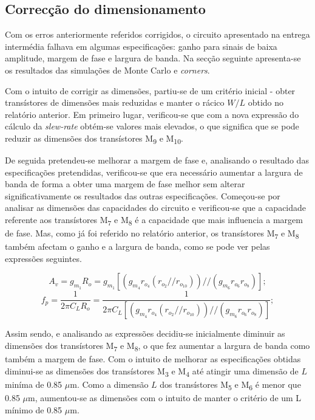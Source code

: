 \documentclass[11pt]{article}
\numberwithin{equation}{section}
\begin{document}
\subsection{Correcção do dimensionamento}

Com os erros anteriormente referidos corrigidos, o circuito apresentado na entrega intermédia falhava em algumas especificações: ganho para sinais de baixa amplitude, margem de fase e largura de banda. Na secção seguinte apresenta-se os resultados das simulações de Monte Carlo e \textit{corners}.

Com o intuito de corrigir as dimensões, partiu-se de um critério inicial - obter transístores de dimensões mais reduzidas e manter o rácico $W/L$ obtido no relatório anterior. Em primeiro lugar, verificou-se que com a nova expressão do cálculo da \textit{slew-rate} obtém-se valores mais elevados, o que significa que se pode reduzir as dimensões dos transístores M\textsubscript{9} e M\textsubscript{10}. 

De seguida pretendeu-se melhorar a margem de fase e, analisando o resultado das especificações pretendidas, verificou-se que era necessário aumentar a largura de banda de forma a obter uma margem de fase melhor sem alterar significativamente os resultados das outras especificações. Começou-se por analisar as dimensões das capacidades do circuito e verificou-se que a capacidade referente aos transístores M\textsubscript{7} e M\textsubscript{8} é a capacidade que mais influencia a margem de fase. Mas, como já foi referido no relatório anterior, os transístores M\textsubscript{7} e M\textsubscript{8} também afectam o ganho e a largura de banda, como se pode ver pelas expressões seguintes. 

\vspace{-3mm}
\begin{equation}
A_{v} = g_{m_1} R_o =  g_{m_1}\left[\left(g_{m_4}r_{o_4}\left(r_{o_2}//r_{o_{10}}\right)\right)//\left(g_{m_6}r_{o_6}r_{o_8}\right)\right];
\end{equation}
\vspace{-2mm}
\begin{equation}
f_{p} = \frac{1}{2\pi C_L R_o} = \frac{1}{2\pi C_L \left[\left(g_{m_4}r_{o_4}\left(r_{o_2}//r_{o_{10}}\right)\right)//\left(g_{m_6}r_{o_6}r_{o_8}\right)\right]};
\end{equation} 

\vspace{2mm}
Assim sendo, e analisando as expressões decidiu-se inicialmente diminuir as dimensões dos transístores M\textsubscript{7} e M\textsubscript{8}, o que fez aumentar a largura de banda como também a margem de fase. Com o intuito de melhorar as especificações obtidas diminui-se as dimensões dos transístores M\textsubscript{3} e M\textsubscript{4} até atingir uma dimensão de $L$ miníma de 0.85 $\mu$m. Como a dimensão $L$ dos transístores M\textsubscript{5} e M\textsubscript{6} é menor que 0.85 $\mu$m, aumentou-se as dimensões com o intuito de manter o critério de um L mínimo de 0.85 $\mu$m.
\end{document}
